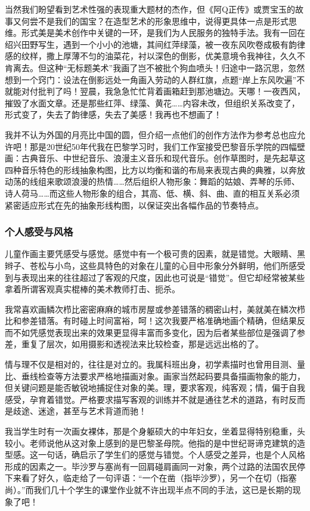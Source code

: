 \documentclass{article}
\begin{document}
当然我们盼望看到艺术性强的表现重大题材的杰作，但《阿Q正传》或贾宝玉的故事又何尝不是我们的国宝？在造型艺术的形象思维中，说得更具体一点是形式思维。形式美是美术创作中关键的一环，是我们为人民服务的独特手法。我有一回在绍兴田野写生，遇到一个小小的池塘，其间红萍绿藻，被一夜东风吹卷成极有韵律感的纹样，撒上厚薄不匀的油菜花，衬以深色的倒影，优美意境令我神往，久久不肯离去。但这种“无标题美术”我画了岂不被批个狗血喷头！归途中一路沉思，忽然想到一个窍门：设法在倒影远处一角画入劳动的人群红旗，点题“岸上东风吹遍”不就能对付批判了吗！翌晨，我急急忙忙背着画箱赶到那池塘边。天哪！一夜西风，摧毁了水面文章。还是那些红萍、绿藻、黄花……内容未改，但组织关系改变了，形式变了，失去了韵律感，失去了美感！我再也不想画了！

我并不认为外国的月亮比中国的圆，但介绍一点他们的创作方法作为参考总也应允许吧！那是20世纪50年代我在巴黎学习时，我们工作室接受巴黎音乐学院的四幅壁画：古典音乐、中世纪音乐、浪漫主义音乐和现代音乐。创作草图时，是先起草这四种音乐特色的形线抽象构图，比方以均衡和谐的布局来表现古典的典雅，以奔放动荡的线组来歌颂浪漫的热情……然后组织人物形象：舞蹈的姑娘、弄琴的乐师、诗人荷马……而这些人物形象的组合，其高、低、横、斜、曲、直的相互关系必须紧密适应形式在先的抽象形线构图，以保证突出各幅作品的节奏特点。
\subsubsection{个人感受与风格}
儿童作画主要凭感受与感觉。感觉中有一个极可贵的因素，就是错觉。大眼睛、黑辫子、苍松与小鸟，这些具特色的对象在儿童的心目中形象分外鲜明，他们所感受到与表现出来的往往超过了客观的尺度，因此也可说是“错觉”。但它却经常被某些拿着所谓客观真实棍棒的美术教师打击、扼杀。

我常喜欢画鳞次栉比密密麻麻的城市房屋或参差错落的稠密山村，美就美在鳞次栉比和参差错落。有时碰上时间富裕，呵！这次我要严格准确地画个精确，但结果反而不如凭感觉表现出来的效果更显得丰富而多变化，因为后者某些部位是强调了参差，重复了层次，如用摄影和透视法来比较检查，那是远远出格的了。

情与理不仅是相对的，往往是对立的。我属科班出身，初学素描时也曾用目测、量比、垂线检查等方法要求严格地描画对象。画家当然起码要具备描画物象的能力，但关键问题是能否敏锐地捕捉住对象的美。理，要求客观，纯客观；情，偏于自我感受，孕育着错觉。严格要求描写客观的训练并不就是通往艺术的道路，有时反而是歧途、迷途，甚至与艺术背道而驰！

我当学生时有一次画女裸体，那是个身躯硕大的中年妇女，坐着显得特别稳重，头较小。老师说他从这对象上感到的是巴黎圣母院。他指的是中世纪哥谛克建筑的造型感。这一句话，确启示了学生们的感觉与错觉。个人感受之差异，也是个人风格形成的因素之一。毕沙罗与塞尚有一回肩碰肩画同一对象，两个过路的法国农民停下来看了好久，临走给了一句评语：“一个在凿（指毕沙罗），另一个在切（指塞尚）。”而我们几十个学生的课堂作业就不许出现半点不同的手法，这已是长期的现象了吧！
\end{document}

